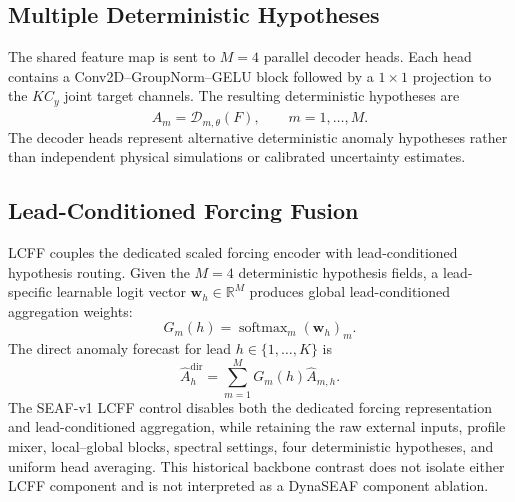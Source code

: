 \documentclass[conference]{IEEEtran}
\begin{document}
\subsection{Multiple Deterministic Hypotheses}
The shared feature map is sent to $M=4$ parallel decoder heads. Each head contains a Conv2D--GroupNorm--GELU block followed by a $1\times1$ projection to the $K C_y$ joint target channels. The resulting deterministic hypotheses are
\begin{equation}
\widehat{A}_m=\mathcal{D}_{m,\theta}(F),\qquad m=1,\ldots,M.
\end{equation}
The decoder heads represent alternative deterministic anomaly hypotheses rather than independent physical simulations or calibrated uncertainty estimates.

\subsection{Lead-Conditioned Forcing Fusion}
LCFF couples the dedicated scaled forcing encoder with lead-conditioned hypothesis routing. Given the $M=4$ deterministic hypothesis fields, a lead-specific learnable logit vector $\mathbf{w}_h \in \mathbb{R}^M$ produces global lead-conditioned aggregation weights:
\begin{equation}
G_m(h)=\operatorname{softmax}_m(\mathbf{w}_h)_m.
\label{eq:lcff}
\end{equation}
The direct anomaly forecast for lead $h \in \{1,\ldots,K\}$ is
\begin{equation}
\widehat{A}^{\mathrm{dir}}_h=\sum_{m=1}^{M}G_m(h)\widehat{A}_{m,h}.
\label{eq:lcff_aggregate}
\end{equation}
The SEAF-v1 LCFF control disables both the dedicated forcing representation and lead-conditioned aggregation, while retaining the raw external inputs, profile mixer, local--global blocks, spectral settings, four deterministic hypotheses, and uniform head averaging. This historical backbone contrast does not isolate either LCFF component and is not interpreted as a DynaSEAF component ablation.
\end{document}
